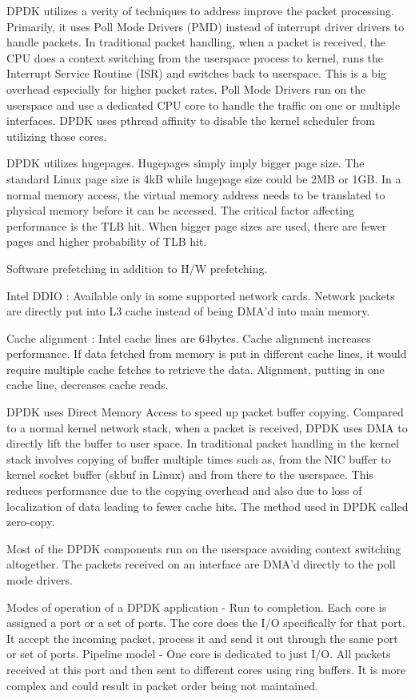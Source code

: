 \documentclass[english, 12pt, a4paper, elec, utf8, a-1b, online]{aaltothesis}
\begin{document}
DPDK utilizes a verity of techniques to address improve the packet processing. Primarily, it uses Poll Mode Drivers (PMD) instead of interrupt driver drivers to handle packets. In traditional packet handling, when a packet is received, the CPU does a context switching from the userspace process to kernel, runs the Interrupt Service Routine (ISR) and switches back to userspace. This is a big overhead especially for higher packet rates. Poll Mode Drivers run on the userspace and use a dedicated CPU core to handle the traffic on one or multiple interfaces. DPDK uses pthread affinity to disable the kernel scheduler from utilizing those cores.

DPDK utilizes hugepages. Hugepages simply imply bigger page size. The standard Linux page size is 4kB while hugepage size could be 2MB or 1GB. In a normal memory access, the virtual memory address needs to be translated to physical memory before it can be accessed. The critical factor affecting performance is the TLB hit. When bigger page sizes are used, there are fewer pages and higher probability of TLB hit.

Software prefetching in addition to H/W prefetching. 

Intel DDIO : Available only in some supported network cards. Network packets are directly put into L3 cache instead of being DMA'd into main memory.

Cache alignment : Intel cache lines are 64bytes. Cache alignment increases performance. If data fetched from memory is put in different cache lines, it would require multiple cache fetches to retrieve the data. Alignment, putting in one cache line, decreases cache reads.

DPDK uses Direct Memory Access to speed up packet buffer copying. Compared to a normal kernel network
stack, when a packet is received, DPDK uses DMA to directly lift the buffer to user space. In traditional packet handling in the kernel stack involves copying of buffer multiple times such as, from the NIC buffer to kernel socket buffer (skbuf in Linux) and from there to the userspace. This reduces performance due to the copying overhead and also due to loss of localization of data leading to fewer cache hits. The method used in DPDK called zero-copy.

Most of the DPDK components run on the userspace avoiding context switching altogether. The packets received on an interface are DMA'd directly to the poll mode drivers. 

Modes of operation of a DPDK application - Run to completion. Each core is assigned a port or a set of ports. The core does the I/O specifically for that port. It accept the incoming packet, process it and send it out through the same port or set of ports. Pipeline model - One core is dedicated to just I/O. All packets received at this port and then sent to different cores using ring buffers. It is more complex and could result in packet order being not maintained.
\end{document}
